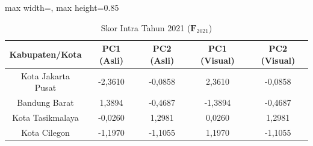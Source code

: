 \begin{table}[H]
\centering
\caption{Skor Intra Tahun 2021 ($\mathbf{F}_{2021}$)} \label{tab:sample1skor_intra_2021}
\begin{adjustbox}{max width=\textwidth, max height=0.85\textheight}
\begin{tabular}{|c|c|c|c|c|}
\hline
\textbf{Kabupaten/Kota} & \textbf{PC1 (Asli)} & \textbf{PC2 (Asli)} & \textbf{PC1 (Visual)} & \textbf{PC2 (Visual)} \\
\hline
Kota Jakarta Pusat & -2,3610 & -0,0858 & 2,3610 & -0,0858 \\
Bandung Barat & 1,3894 & -0,4687 & -1,3894 & -0,4687 \\
Kota Tasikmalaya & -0,0260 & 1,2981 & 0,0260 & 1,2981 \\
Kota Cilegon & -1,1970 & -1,1055 & 1,1970 & -1,1055 \\
\hline
\end{tabular}
\end{adjustbox}
\end{table}